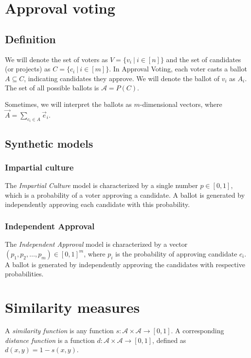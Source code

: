 \documentclass[en]{pracamgr}
\begin{document}
\section{Approval voting}

\subsection{Definition}

We will denote the set of voters as $V = \{ v_i \ |\ i \in [n]\}$ and the set of
candidates (or projects) as $C = \{c_i \ |\ i \in [m] \}$. In Approval Voting,
each voter casts a ballot $A \subseteq C$, indicating candidates they
approve. We will denote the ballot of $v_i$ as $A_i$. The set of all possible
ballots is $\mathcal A = P(C)$.

Sometimes, we will interpret the ballots as $m$-dimensional vectors, where
$\vec A = \sum\limits_{c_i \in A} \vec e_i$.

\subsection{Synthetic models}

\subsubsection{Impartial culture}

The \textit{Impartial Culture} model is characterized by a single number
$p \in [0,1]$, which is a probability of a voter approving a candidate. A ballot
is generated by independently approving each candidate with this probability.

\subsubsection{Independent Approval}

The \textit{Independent Approval} model is characterized by a vector
$(p_1, p_2, \ldots, p_m) \in [0,1]^m$, where $p_i$ is the probability of
approving candidate $c_i$. A ballot is generated by independently approving the
candidates with respective probabilities.

\section{Similarity measures}

A \textit{similarity function} is any function
$s : \mathcal A \times \mathcal A \to [0,1]$.
A corresponding \textit{distance function} is a function
$d : \mathcal A \times \mathcal A \to [0,1]$, defined as $d(x,y) = 1 - s(x,y)$.
\end{document}
